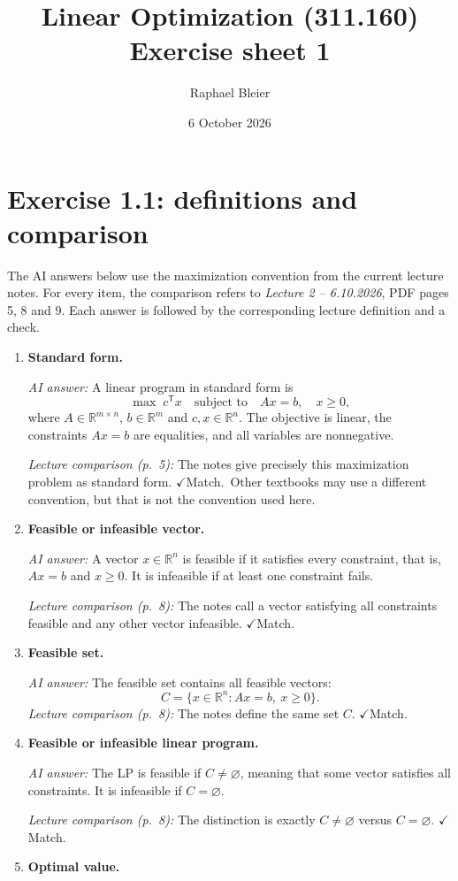 \documentclass[11pt,a4paper]{article}
\title{Linear Optimization (311.160)\\Exercise sheet 1}
\author{Raphael Bleier}
\date{6 October 2026}
\newcommand{\match}{\(\checkmark\)\;Match.}
\begin{document}
\maketitle
\section*{Exercise 1.1: definitions and comparison}
The AI answers below use the maximization convention from the current lecture notes. For every item, the comparison refers to \emph{Lecture 2 -- 6.10.2026}, PDF pages 5, 8 and 9. Each answer is followed by the corresponding lecture definition and a check.
\begin{enumerate}[leftmargin=*,itemsep=10pt]
\item \textbf{Standard form.}

\textit{AI answer:} A linear program in standard form is
\[
\max\;c^{\mathsf T}x\quad\text{subject to}\quad Ax=b,\quad x\geq0,
\]
where $A\in\mathbb R^{m\times n}$, $b\in\mathbb R^m$ and $c,x\in\mathbb R^n$. The objective is linear, the constraints $Ax=b$ are equalities, and all variables are nonnegative.

\textit{Lecture comparison (p.~5):} The notes give precisely this maximization problem as standard form. \match\ Other textbooks may use a different convention, but that is not the convention used here.
\item \textbf{Feasible or infeasible vector.}

\textit{AI answer:} A vector $x\in\mathbb R^n$ is feasible if it satisfies every constraint, that is, $Ax=b$ and $x\geq0$. It is infeasible if at least one constraint fails.

\textit{Lecture comparison (p.~8):} The notes call a vector satisfying all constraints feasible and any other vector infeasible. \match
\item \textbf{Feasible set.}

\textit{AI answer:} The feasible set contains all feasible vectors:
\[
C=\{x\in\mathbb R^n:Ax=b,\ x\geq0\}.
\]
\textit{Lecture comparison (p.~8):} The notes define the same set $C$. \match
\item \textbf{Feasible or infeasible linear program.}

\textit{AI answer:} The LP is feasible if $C\neq\varnothing$, meaning that some vector satisfies all constraints. It is infeasible if $C=\varnothing$.

\textit{Lecture comparison (p.~8):} The distinction is exactly $C\neq\varnothing$ versus $C=\varnothing$. \match
\item \textbf{Optimal value.}


\end{enumerate}
\end{document}
